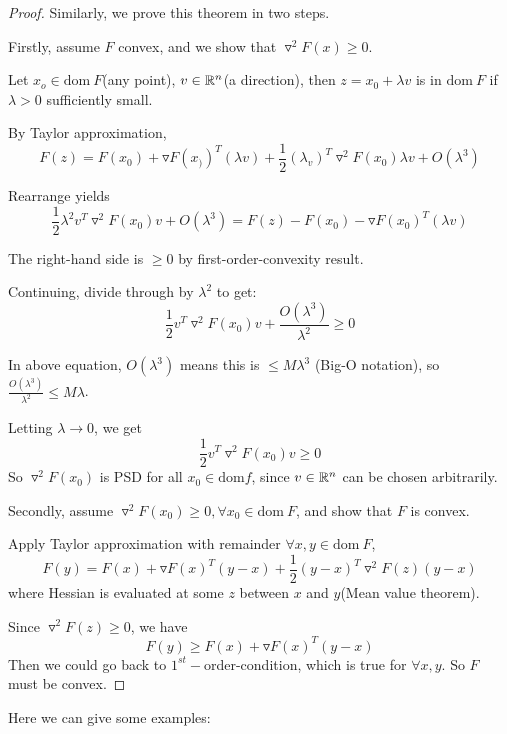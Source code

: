 \begin{proof}

Similarly, we prove this theorem in two steps.

Firstly, assume $F$ convex, and we show that $\triangledown^2F(x)\geq 0$.

Let $x_o \in \text{dom}\ F$(any point), $v\in \mathbb{R}^n$(a direction), then $z = x_0 + \lambda v$ is in $\text{dom}\ F$ if $\lambda > 0$ sufficiently small. 

By Taylor approximation, 
$$F(z) = F(x_0) + \triangledown F(x_))^T(\lambda v) + \frac{1}{2}(\lambda_v)^T\triangledown^2F(x_0)\lambda v + O(\lambda^3)$$

Rearrange yields 
$$\frac{1}{2}\lambda^2v^T\triangledown^2F(x_0)v+O(\lambda^3) = F(z) - F(x_0) - \triangledown F(x_0)^T(\lambda v)$$

The right-hand side is $\geq 0$ by first-order-convexity result.

Continuing, divide through by $\lambda^2$ to get:
$$\frac{1}{2}v^T\triangledown^2F(x_0)v + \frac{O(\lambda^3)}{\lambda^2} \geq 0$$

In above equation, $O(\lambda^3)$ means this is $\leq M\lambda^3$ (Big-O notation), so $\frac{O(\lambda^3)}{\lambda^2} \leq M\lambda$.

Letting $\lambda\rightarrow 0$, we get 
$$\frac{1}{2}v^T\triangledown^2F(x_0)v\geq 0$$
So $\triangledown^2F(x_0)$ is PSD for all $x_0 \in \text{dom}f$, since $v\in \mathbb{R}^n$ can be chosen arbitrarily.


\vspace{0.3cm}
Secondly, assume $\triangledown^2F(x_0)\geq 0, \forall x_0\in \text{dom}\ F$, and show that $F$ is convex.

Apply Taylor approximation with remainder $\forall x,y\in \text{dom}\ F$, 
$$F(y) =F(x) + \triangledown F(x)^T(y-x) + \frac{1}{2}(y-x)^T\triangledown^2F(z)(y-x)$$
where Hessian is evaluated at some $z$ between $x$ and $y$(Mean value theorem).

Since $\triangledown^2F(z)\geq 0$, we have
$$F(y) \geq F(x) + \triangledown F(x)^T (y-x)$$
Then we could go back to $1^{st}-$order-condition, which is true for $\forall x,y$. So $F$ must be convex. 
\end{proof}



Here we can give some examples:

